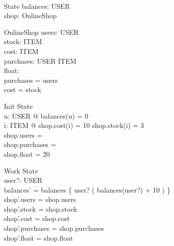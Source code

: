 \documentclass[a4paper]{article}
\begin{document}
\begin{zed}
	 \\
\end{zed}

\begin{schema}{State}
	balances: USER \pfun \nat\\
	shop: OnlineShop \\
\end{schema}

\begin{schema}{OnlineShop}
	users: \power USER \\
	stock: ITEM \fun \nat \\
	cost: ITEM \fun \nat \\
	purchases: USER \pfun \seq ITEM \\
	float: \nat \\
	\where
	\dom purchases = users \\
	\dom cost = \dom stock \\
\end{schema}

\begin{schema}{Init}
	State\\
	\where
	\forall u: USER @ balances(u) = 0 \\
	\forall i: ITEM @ shop.cost(i) = 10 \land shop.stock(i) = 3 \\
	shop.users = \emptyset \\
	shop.purchases = \emptyset \\
	shop.float = 20 \\
\end{schema}

\begin{schema}{Work}
	\Delta State \\
	user?: USER\\
	\where
	 balances' = balances \oplus  \{ user? \mapsto ( balances(user?) + 10 ) \} \\
	shop'.users = shop.users \\
	shop'.stock = shop.stock \\
	shop'.cost = shop.cost \\
	shop'.purchases = shop.purchases \\
	shop'.float = shop.float \\
\end{schema}
\end{document}
